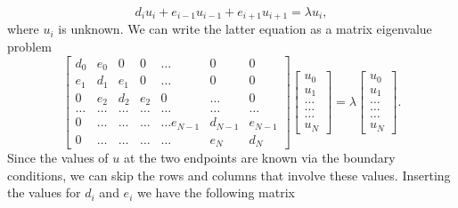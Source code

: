 \documentclass[%
oneside,                 %
final,                   %
10pt]{article}
\begin{document}
\begin{equation*}
d_iu_i+e_{i-1}u_{i-1}+e_{i+1}u_{i+1}  = \lambda u_i,
\end{equation*}
where $u_i$ is unknown. We can write the 
latter equation as a matrix eigenvalue problem
\begin{equation}
    \begin{bmatrix}d_0 & e_0 & 0   & 0    & \dots  &0     & 0 \\
                                e_1 & d_1 & e_1 & 0    & \dots  &0     &0 \\
                                0   & e_2 & d_2 & e_2  &0       &\dots & 0\\
                                \dots  & \dots & \dots & \dots  &\dots      &\dots & \dots\\
                                0   & \dots & \dots & \dots  &\dots  e_{N-1}     &d_{N-1} & e_{N-1}\\
                                0   & \dots & \dots & \dots  &\dots       &e_{N} & d_{N}
             \end{bmatrix}  \begin{bmatrix} u_{0} \\
                                                              u_{1} \\
                                                              \dots\\ \dots\\ \dots\\
                                                              u_{N}
             \end{bmatrix}=\lambda \begin{bmatrix} u_{0} \\
                                                              u_{1} \\
                                                              \dots\\ \dots\\ \dots\\
                                                              u_{N}
             \end{bmatrix}.  
      \label{eq:sematrix}
\end{equation}
Since the values of $u$ at the two endpoints are known via the boundary conditions, we can skip the rows and columns that involve these values. Inserting the values for $d_i$ and $e_i$ we have the following matrix
\end{document}
